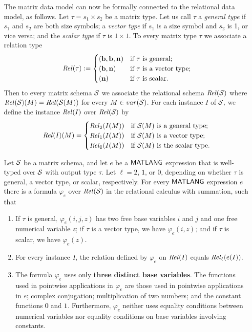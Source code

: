 The matrix data model can now be formally connected to the relational data
model, as follows. Let $\tau = s_1\times s_2$ be a matrix type.  Let us call $\tau$ a
\emph{general type} if $s_1$ and $s_2$ are both size symbols; a
\emph{vector type} if $s_1$ is a size symbol and $s_2$ is 1, or
vice versa; and the \emph{scalar type} if $\tau$ is $1\times 1$.
To every matrix type $\tau$ we associate a relation type
$$ \mathit{Rel}(\tau) := \begin{cases}
(\mathbf{b},\mathbf{b},\mathbf{n}) & \text{if $\tau$ is general;} \\
(\mathbf{b},\mathbf{n}) & \text{if $\tau$ is a vector type;} \\
(\mathbf{n}) & \text{if $\tau$ is scalar.} \end{cases} $$
Then to every matrix schema $\mathcal{S}$ we associate the relational
schema $\mathit{Rel}(\mathcal{S})$ where $\mathit{Rel}(\mathcal{S})(M) = \mathit{Rel}(\mathcal{S}(M))$ for
every $M \in var(\mathcal{S})$.  For each instance $I$ of
$\mathcal{S}$, we define the instance $\mathit{Rel}(I)$ over
$\mathit{Rel}(\mathcal{S})$ by $$ \mathit{Rel}(I)(M) = \begin{cases} 
\mathit{Rel}_2(I(M)) & \text{if $\mathcal{S}(M)$ is a general type;} \\
\mathit{Rel}_1(I(M)) & \text{if $\mathcal{S}(M)$ is a vector type;} \\
\mathit{Rel}_0(I(M)) & \text{if $\mathcal{S}(M)$ is the scalar type.}
\end{cases} $$  

\begin{proposition} 
Let $\mathcal{S}$ be a matrix schema, and let $e$ be a $\mathsf{MATLANG}$ expression
that is well-typed over $\mathcal{S}$ with output type $\tau$.
Let $\ell=2$, $1$,
or $0$, depending on whether $\tau$ is general, a vector type, or
scalar, respectively.
For every $\mathsf{MATLANG}$ expression $e$ there is a formula
$\varphi_e$ over $\mathit{Rel}(\mathcal{S})$
in the relational calculus with summation, such that
\begin{enumerate}
\item
If\/ $\tau$ is general, $\varphi_e(i,j,z)$ has two free base
variables $i$ and $j$ and one free numerical variable $z$; if\/
$\tau$ is a vector type, we have $\varphi_e(i,z)$; and if\/ $\tau$ is
scalar, we have $\varphi_e(z)$.
\item
For every instance $I$, the relation defined by $\varphi_e$ on
$\mathit{Rel}(I)$ equals $\mathit{Rel}_\ell(e(I))$.
\item
The formula $\varphi_e$ uses only {\bf three distinct base variables}. The functions used in pointwise applications in $\varphi_e$ 
 are those used in
pointwise applications in $e$; complex conjugation;
multiplication of two numbers;
and the constant functions $0$ and $1$.
 Furthermore, $\varphi_e$ neither uses equality conditions between numerical variables nor equality conditions on base variables involving constants.
\end{enumerate}
\end{proposition}


